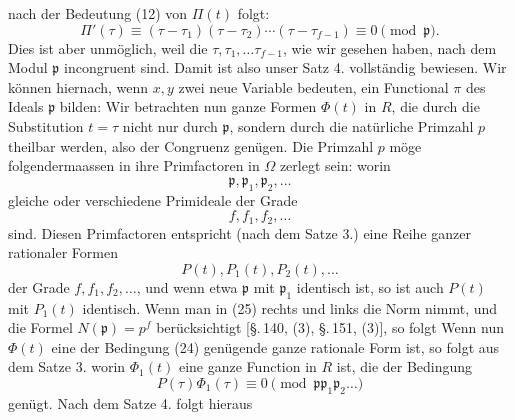 nach der Bedeutung (12) von $\Pi(t)$ folgt:
\[ \Pi'(\tau) \equiv (\tau-\tau_1)(\tau-\tau_2) \cdots (\tau-\tau_{f-1}) \equiv 0 \pmod{\mathfrak p}. \]
Dies ist aber unmöglich, weil die $\tau, \tau_1, \ldots \tau_{f-1}$, wie wir gesehen haben, nach dem Modul $\mathfrak p$ incongruent sind. Damit ist also unser Satz 4. vollständig bewiesen. Wir können hiernach, wenn $x, y$ zwei neue Variable bedeuten, ein Functional $\pi$ des Ideals $\mathfrak p$ bilden:
Wir betrachten nun ganze Formen $\Phi(t)$ in $R$, die durch die Substitution $t=\tau$ nicht nur durch $\mathfrak p$, sondern durch die natürliche Primzahl $p$ theilbar werden, also der Congruenz
genügen. Die Primzahl $p$ möge folgendermaassen in ihre Primfactoren in $\Omega$ zerlegt sein:
worin
\[ \mathfrak p, \mathfrak p_1, \mathfrak p_2, \ldots \]
gleiche oder verschiedene Primideale der Grade
\[ f, f_1, f_2, \ldots \]
sind. Diesen Primfactoren entspricht (nach dem Satze 3.) eine Reihe ganzer rationaler Formen
\[ P(t), P_1(t), P_2(t), \ldots \]
der Grade $f, f_1, f_2, \ldots$, und wenn etwa $\mathfrak p$ mit $\mathfrak p_1$ identisch ist, so ist auch $P(t)$ mit $P_1(t)$ identisch. Wenn man in (25) rechts und links die Norm nimmt, und die Formel $N(\mathfrak p) = p^f$ berücksichtigt [\S.\,140, (3), \S.\,151, (3)], so folgt
Wenn nun $\Phi(t)$ eine der Bedingung (24) genügende ganze rationale Form ist, so folgt aus dem Satze 3.
worin $\Phi_1(t)$ eine ganze Function in $R$ ist, die der Bedingung
\[ P(\tau) \Phi_1(\tau) \equiv 0 \pmod{\mathfrak p \mathfrak p_1 \mathfrak p_2 \ldots} \]
genügt. Nach dem Satze 4. folgt hieraus
